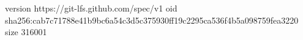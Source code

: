 version https://git-lfs.github.com/spec/v1
oid sha256:cab7c71788e41b9bc6a54c3d5c375930ff19c2295ca536f4b5a098759fea3220
size 316001

